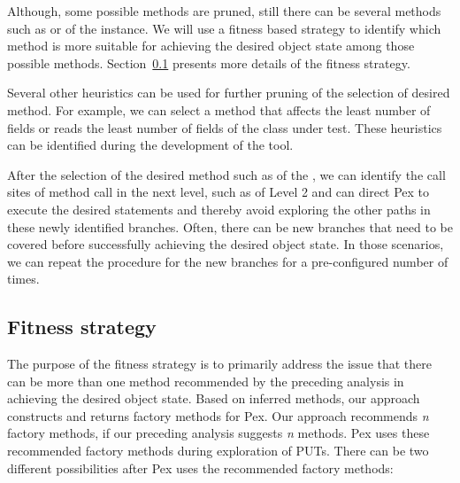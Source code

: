 Although, some possible methods are pruned, still there can be several methods such as  or  of the  instance. We will use a fitness based strategy to identify which method is more suitable for achieving the desired object state among those possible methods. Section~\ref{sec:fitness} presents more details of the fitness strategy.

Several other heuristics can be used for further pruning of the selection of desired method. For example, we can select a method that affects the least number of fields or reads the least number of fields of the class under test. These heuristics can be identified during the development of the tool.

After the selection of the desired method such as  of the , we can identify the call sites of method call in the next level, such as  of Level 2 and can direct Pex to execute the desired statements and thereby avoid exploring the other paths in these newly identified branches. Often, there can be new branches that need to be covered before successfully achieving the desired object state. In those scenarios, we can repeat the procedure for the new branches for a pre-configured number of times.

\subsection{Fitness strategy}
\label{sec:fitness}

The purpose of the fitness strategy is to primarily address the issue that there can be more than one method recommended by the preceding analysis in achieving the desired object state. Based on inferred methods, our approach constructs and returns factory methods for Pex. Our approach recommends \emph{n} factory methods, if our preceding analysis suggests \emph{n} methods. Pex uses these recommended factory methods during exploration of PUTs. There can be two different possibilities after Pex uses the recommended factory methods:

